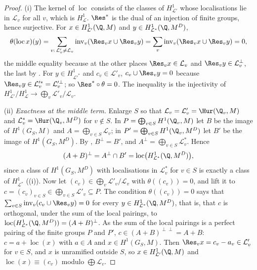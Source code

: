 \begin{proof}
(i) The kernel of $\operatorname{loc}$ consists of the classes of $H^1_{\mathcal L'}$ whose localisations lie in $\mathcal L_v$ for all $v$, which is $H^1_{\mathcal L}$. $\Res^*$ is the dual of an
injection of finite groups, hence surjective. For $x\in H^1_{\mathcal L'}(\Q,M)$ and $y\in H^1_{\mathcal L^*}(\Q,M^D)$,
\[
\theta(\operatorname{loc}x)(y)=\sum_{v:\,\mathcal L'_v\ne\mathcal L_v}\operatorname{inv}_v(\Res_vx\cup\Res_vy)=\sum_v\operatorname{inv}_v(\Res_vx\cup\Res_vy)=0,
\]
the middle equality because at the other places $\Res_vx\in\mathcal L_v$ and $\Res_vy\in\mathcal L_v^\perp$, the last by . For $y\in H^1_{\mathcal L'^*}$ and
$c_v\in\mathcal L'_v$, $c_v\cup\Res_vy=0$ because $\Res_vy\in\mathcal L'^*_v=\mathcal L_v'^\perp$; so $\Res^*\circ\theta=0$. The inequality is the injectivity of
$H^1_{\mathcal L'}/H^1_{\mathcal L}\to\bigoplus_v\mathcal L'_v/\mathcal L_v$.

(ii) \emph{Exactness at the middle term.} Enlarge $S$ so that $\mathcal L_v=\mathcal L'_v=\Hur(\Q_v,M)$ and $\mathcal L^*_v=\Hur(\Q_v,M^D)$ for $v\notin S$. In $P=\bigoplus_{v\in S}H^1(\Q_v,M)$ let $B$ be
the image of $H^1(G_S,M)$ and $A=\bigoplus_{v\in S}\mathcal L_v$; in $P'=\bigoplus_{v\in S}H^1(\Q_v,M^D)$ let $B'$ be the image of $H^1(G_S,M^D)$. By ,
$B^\perp=B'$, and $A^\perp=\bigoplus_{v\in S}\mathcal L^*_v$. Hence
\[
(A+B)^\perp=A^\perp\cap B'=\operatorname{loc}\bigl(H^1_{\mathcal L^*}(\Q,M^D)\bigr),
\]
since a class of $H^1(G_S,M^D)$ with localisations in $\mathcal L^*_v$ for $v\in S$ is exactly a class of $H^1_{\mathcal L^*}$ ((i)). Now let
$(c_v)\in\bigoplus_v\mathcal L'_v/\mathcal L_v$ with $\theta((c_v))=0$, and lift it to $c=(c_v)_{v\in S}\in\bigoplus_{v\in S}\mathcal L'_v\subseteq P$. The condition $\theta((c_v))=0$
says that $\sum_{v\in S}\operatorname{inv}_v(c_v\cup\Res_vy)=0$ for every $y\in H^1_{\mathcal L^*}(\Q,M^D)$, that is, that $c$ is orthogonal, under the sum of the local pairings, to
$\operatorname{loc}(H^1_{\mathcal L^*}(\Q,M^D))=(A+B)^\perp$. As the sum of the local pairings is a perfect pairing of the finite groups $P$ and $P'$, $c\in(A+B)^{\perp\perp}=A+B$: $c=a+\operatorname{loc}(x)$ with $a\in A$ and $x\in H^1(G_S,M)$. Then $\Res_vx=c_v-a_v\in\mathcal L'_v$ for $v\in S$, and $x$ is
unramified outside $S$, so $x\in H^1_{\mathcal L'}(\Q,M)$ and $\operatorname{loc}(x)\equiv(c_v)$ modulo $\bigoplus\mathcal L_v$.


\end{proof}
